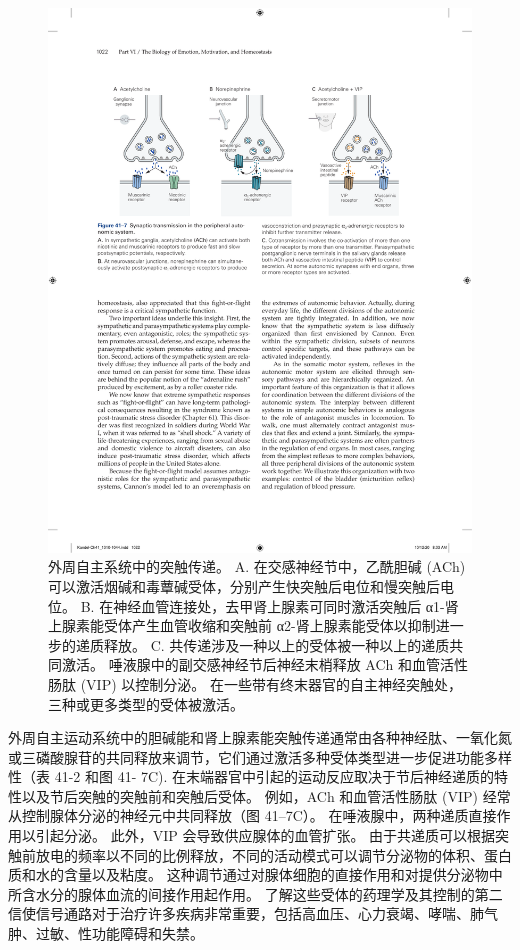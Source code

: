 \begin{figure}[htbp]
	\centering
	\includegraphics[width=0.8\linewidth]{chap41/fig_41_7}
	\caption{外周自主系统中的突触传递。 A. 在交感神经节中，乙酰胆碱 (ACh) 可以激活烟碱和毒蕈碱受体，分别产生快突触后电位和慢突触后电位。 B. 在神经血管连接处，去甲肾上腺素可同时激活突触后 α1-肾上腺素能受体产生血管收缩和突触前 α2-肾上腺素能受体以抑制进一步的递质释放。 C. 共传递涉及一种以上的受体被一种以上的递质共同激活。 唾液腺中的副交感神经节后神经末梢释放 ACh 和血管活性肠肽 (VIP) 以控制分泌。 在一些带有终末器官的自主神经突触处，三种或更多类型的受体被激活。}
	\label{fig:41_7}
\end{figure}

外周自主运动系统中的胆碱能和肾上腺素能突触传递通常由各种神经肽、一氧化氮或三磷酸腺苷的共同释放来调节，它们通过激活多种受体类型进一步促进功能多样性（表 41-2 和图 41- 7C). 在末端器官中引起的运动反应取决于节后神经递质的特性以及节后突触的突触前和突触后受体。 例如，ACh 和血管活性肠肽 (VIP) 经常从控制腺体分泌的神经元中共同释放（图 41–7C）。 在唾液腺中，两种递质直接作用以引起分泌。 此外，VIP 会导致供应腺体的血管扩张。 由于共递质可以根据突触前放电的频率以不同的比例释放，不同的活动模式可以调节分泌物的体积、蛋白质和水的含量以及粘度。 这种调节通过对腺体细胞的直接作用和对提供分泌物中所含水分的腺体血流的间接作用起作用。 了解这些受体的药理学及其控制的第二信使信号通路对于治疗许多疾病非常重要，包括高血压、心力衰竭、哮喘、肺气肿、过敏、性功能障碍和失禁。

